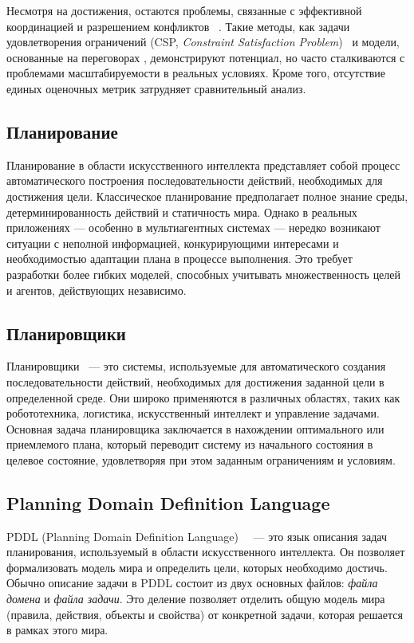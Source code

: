 Несмотря на достижения, остаются проблемы, связанные с эффективной координацией
и разрешением конфликтов~\cite{galesloot2024factoredonlineplanningmanyagent}
\cite{zhang2014formalanalysisrequiredcooperation}. Такие методы, как задачи удовлетворения
ограничений (CSP, \textit{Constraint Satisfaction Problem})~\cite{KOMENDA201476} и модели, основанные на переговорах
\cite{GROSZ1996269,RABELO1994303}, демонстрируют потенциал, но часто сталкиваются
с проблемами масштабируемости в реальных условиях. Кроме того, отсутствие единых
оценочных метрик затрудняет сравнительный анализ.


\subsection*{Планирование}

Планирование в области искусственного интеллекта представляет собой процесс автоматического построения последовательности действий, необходимых для достижения цели. Классическое планирование предполагает полное знание среды, детерминированность действий и статичность мира. Однако в реальных приложениях — особенно в мультиагентных системах — нередко возникают ситуации с неполной информацией, конкурирующими интересами и необходимостью адаптации плана в процессе выполнения. Это требует разработки более гибких моделей, способных учитывать множественность целей и агентов, действующих независимо.

\subsection*{Планировщики}

Планировщики~\cite{ghallab2004automated} --- это системы, используемые для автоматического создания последовательности действий, необходимых для достижения заданной цели в определенной среде. Они широко применяются в различных областях, таких как робототехника, логистика, искусственный интеллект и управление задачами. Основная задача планировщика заключается в нахождении оптимального или приемлемого плана, который переводит систему из начального состояния в целевое состояние, удовлетворяя при этом заданным ограничениям и условиям.

\subsection*{Planning Domain Definition Language}

PDDL (Planning Domain Definition Language)~\cite{mcdermott1998pddl}~\cite{gerevini2006pddl3}
--- это язык описания задач планирования, используемый в области искусственного интеллекта.
Он позволяет формализовать модель мира и определить цели, которых необходимо достичь.
Обычно описание задачи в PDDL состоит из двух основных файлов:
\textit{файла домена} и \textit{файла задачи}.
Это деление позволяет отделить общую модель мира (правила, действия, объекты и свойства)
от конкретной задачи, которая решается в рамках этого мира.

